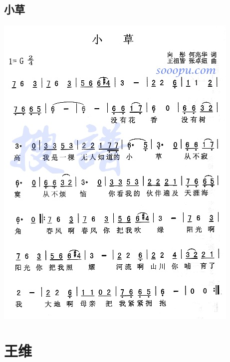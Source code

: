 \documentclass[cn,pad,chinesefont=nofont]{elegantbook}
\begin{document}
\section{小草}
	\includegraphics[width=\textwidth]{dongxiao/20200627-小草.jpg}  

\chapter{王维}
\end{document}
